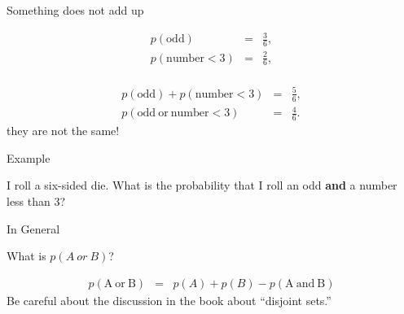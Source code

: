 \begin{frame}{Something does not add up}

  \begin{eqnarray*}
    p(\mathrm{odd}) & = & \frac{3}{6}, \\
    p(\mathrm{number}<3) & = & \frac{2}{6}, \\
  \end{eqnarray*}

  {

    \begin{eqnarray*}
      p(\mathrm{odd}) + p(\mathrm{number}<3) & = & \frac{5}{6}, \\
      p(\mathrm{odd~or~\mathrm{number}<3}) & = & \frac{4}{6}.
    \end{eqnarray*}
    they are not the same!

  }

  
\end{frame}


\begin{frame}{Example}

  I roll a six-sided die. What is the probability that I roll an odd
  \textbf{and} a number less than 3?
  
\end{frame}

\begin{frame}{In General}

  What is $p(A~or~B)$?

  {

    \begin{eqnarray*}
      p(\mathrm{A~or~B}) & = & p(A) + p(B) - p(\mathrm{A~and~B})
    \end{eqnarray*}
    Be careful about the discussion in the book about ``disjoint sets.''

  }
  
\end{frame}


